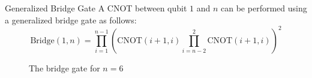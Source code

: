 \begin{definition}{Generalized Bridge Gate}
  A CNOT between qubit $1$ and $n$ can be performed using a generalized bridge gate as follows:
  \begin{equation} \mathrm{Bridge}(1, n) = \prod_{i=1}^{n - 1}(\mathrm{CNOT}(i + 1, i) \prod_{i=n - 2}^{2}\mathrm{CNOT}(i + 1, i))^2
  \end{equation}
\end{definition}


\def\qceq{\midstick[6,brackets=none]{=}}
\begin{figure}[h]
  \centering
{}
  \caption{The bridge gate for $n=6$}
\end{figure}
